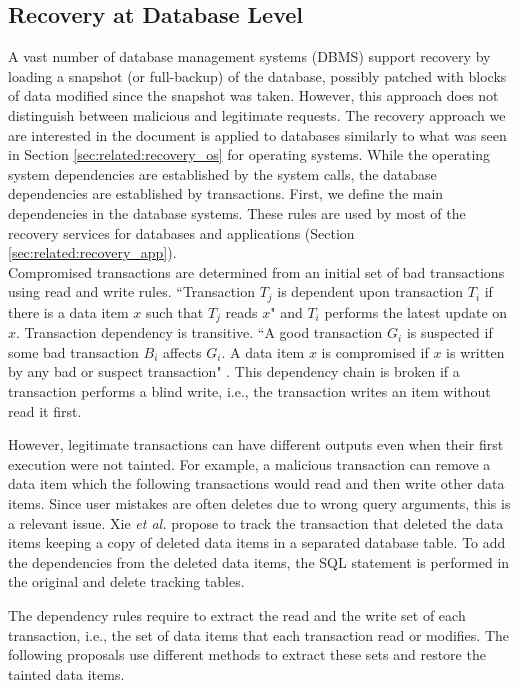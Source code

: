 \subsection{Recovery at Database Level}
\label{sec:related:recovery_database}

A vast number of database management systems (DBMS) support recovery by loading a snapshot (or full-backup) of the database, possibly patched with blocks of data modified since the snapshot was taken. However, this approach does not distinguish between malicious and legitimate requests. The recovery approach we are interested in the document is applied to databases similarly to what was seen in Section \ref{sec:related:recovery_os} for operating systems. While the operating system dependencies are established by the system calls, the database dependencies are established by transactions. First, we define the main dependencies in the database systems. These rules are used by most of the recovery services for databases and applications (Section \ref{sec:related:recovery_app}).\\

Compromised transactions are determined from an initial set of bad transactions using read and write rules. ``Transaction $ T_j$ is dependent upon transaction $ T_i$ if there is a data item $x$ such that $T_j$ reads $x$" \cite{Ammann2002} and $T_i$ performs the latest update on $x$. Transaction dependency is transitive. ``A good transaction $G_i$ is suspected if some bad transaction $B_i$ affects $G_i$. A data item $x$ is compromised if $x$ is written by any bad or suspect transaction" \cite{Ammann2002}. This dependency chain is broken if a transaction performs a blind write, i.e., the transaction writes an item without read it first.

However, legitimate transactions can have different outputs even when their first execution were not tainted. For example, a malicious transaction can remove a data item which the following transactions would read and then write other data items. Since user mistakes are often deletes due to wrong query arguments, this is a relevant issue. Xie \textit{et al.} \cite{Xie2008} propose to track the transaction that deleted the data items keeping a copy of deleted data items in a separated database table. To add the dependencies from the deleted data items, the \ac{SQL} statement is performed in the original and delete tracking tables. 

The dependency rules require to extract the read and the write set of each transaction, i.e., the set of data items that each transaction read or modifies. The following proposals use different methods to extract these sets and restore the tainted data items.\\


